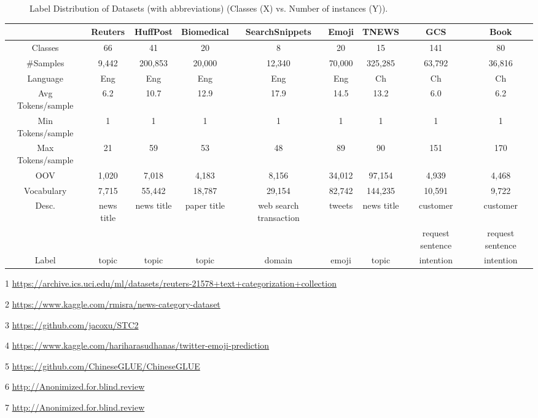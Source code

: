 \begin{figure}[th]
	\caption{Label Distribution of Datasets (with abbreviations) (Classes (X) vs. Number of 
instances (Y)). 
} 
\label{fig:distribution}
\end{figure}

\begin{table}[th]
	\small
	\centering
	\begin{threeparttable}
	\begin{tabular}{ccccccccc}
		\toprule
		& Reuters\tnote{1}  & HuffPost\tnote{2} & Biomedical\tnote{3}  & SearchSnippets\tnote{3} & Emoji\tnote{4}  & TNEWS \tnote{5}   & GCS\tnote{6}  & Book\tnote{7} \\ \hline
		Classes       & 66      & 41    &20&8  & 20 & 15         & 141                & 80    \\
		\#Samples     & 9,442   &200,853   &20,000&12,340    &70,000       & 325,285    & 63,792                &36,816      \\
		Language      & Eng      & Eng                  & Eng          & Eng    &Eng& Ch         & Ch   &Ch    \\
		Avg Tokens/sample & 6.2      &10.7    &12.9&17.9   &14.5    & 13.2        &     6.0      &6.2      \\
		Min Tokens/sample & 1 &1 & 1 & 1 &1&1         &1&1\\
		Max Tokens/sample & 21 &59 &53&48 &89 & 90 & 151    &170 \\
		OOV &1,020&7,018&4,183&8,156 &34,012 &97,154&4,939   &4,468\\
		Vocabulary& 7,715&55,442&18,787&29,154&82,742&144,235&10,591     &9,722\\
		Desc.         & news title  & news title &paper title&web search transaction &tweets &news title& customer  &customer
   \\ 
	& & &  & & &&request sentence &request sentence \\
		Label         & topic     & topic    &topic &domain  &emoji   & topic   & intention                      &intention\\
		\bottomrule              
	\end{tabular}

\begin{tablenotes}
	\item[1] \url{https://archive.ics.uci.edu/ml/datasets/reuters-21578+text+categorization+collection}
	\item[2] \url{https://www.kaggle.com/rmisra/news-category-dataset}
	\item[3] \url{https://github.com/jacoxu/STC2}
	\item[4] \url{https://www.kaggle.com/hariharasudhanas/twitter-emoji-prediction}
	\item[5] \url{https://github.com/ChineseGLUE/ChineseGLUE}
	\item[6] \url{http://Anonimized.for.blind.review}
	\item[7] \url{http://Anonimized.for.blind.review}
	

\end{tablenotes}
\end{threeparttable}
\end{table}
